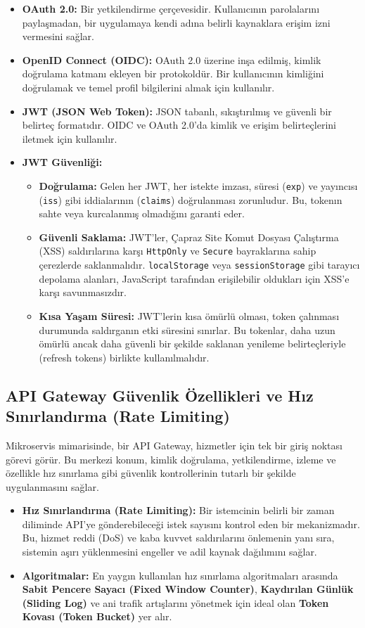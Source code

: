 \begin{itemize}
\item \textbf{OAuth 2.0:} Bir yetkilendirme çerçevesidir. Kullanıcının parolalarını paylaşmadan, bir uygulamaya kendi adına belirli kaynaklara erişim izni vermesini sağlar.
\item \textbf{OpenID Connect (OIDC):} OAuth 2.0 üzerine inşa edilmiş, kimlik doğrulama katmanı ekleyen bir protokoldür. Bir kullanıcının kimliğini doğrulamak ve temel profil bilgilerini almak için kullanılır.
\item \textbf{JWT (JSON Web Token):} JSON tabanlı, sıkıştırılmış ve güvenli bir belirteç formatıdır. OIDC ve OAuth 2.0'da kimlik ve erişim belirteçlerini iletmek için kullanılır.
\item \textbf{JWT Güvenliği:}
\begin{itemize}
\item \textbf{Doğrulama:} Gelen her JWT, her istekte imzası, süresi (\texttt{exp}) ve yayıncısı (\texttt{iss}) gibi iddialarının (\texttt{claims}) doğrulanması zorunludur. Bu, tokenın sahte veya kurcalanmış olmadığını garanti eder.
\item \textbf{Güvenli Saklama:} JWT'ler, Çapraz Site Komut Dosyası Çalıştırma (XSS) saldırılarına karşı \texttt{HttpOnly} ve \texttt{Secure} bayraklarına sahip çerezlerde saklanmalıdır. \texttt{localStorage} veya \texttt{sessionStorage} gibi tarayıcı depolama alanları, JavaScript tarafından erişilebilir oldukları için XSS'e karşı savunmasızdır.
\item \textbf{Kısa Yaşam Süresi:} JWT'lerin kısa ömürlü olması, token çalınması durumunda saldırganın etki süresini sınırlar. Bu tokenlar, daha uzun ömürlü ancak daha güvenli bir şekilde saklanan yenileme belirteçleriyle (refresh tokens) birlikte kullanılmalıdır.
\end{itemize}
\end{itemize}

\subsection{API Gateway Güvenlik Özellikleri ve Hız Sınırlandırma (Rate Limiting)}

Mikroservis mimarisinde, bir API Gateway, hizmetler için tek bir giriş noktası görevi görür. Bu merkezi konum, kimlik doğrulama, yetkilendirme, izleme ve özellikle hız sınırlama gibi güvenlik kontrollerinin tutarlı bir şekilde uygulanmasını sağlar.

\begin{itemize}
\item \textbf{Hız Sınırlandırma (Rate Limiting):} Bir istemcinin belirli bir zaman diliminde API'ye gönderebileceği istek sayısını kontrol eden bir mekanizmadır. Bu, hizmet reddi (DoS) ve kaba kuvvet saldırılarını önlemenin yanı sıra, sistemin aşırı yüklenmesini engeller ve adil kaynak dağılımını sağlar.
\item \textbf{Algoritmalar:} En yaygın kullanılan hız sınırlama algoritmaları arasında \textbf{Sabit Pencere Sayacı (Fixed Window Counter)}, \textbf{Kaydırılan Günlük (Sliding Log)} ve ani trafik artışlarını yönetmek için ideal olan \textbf{Token Kovası (Token Bucket)} yer alır.
\end{itemize}

